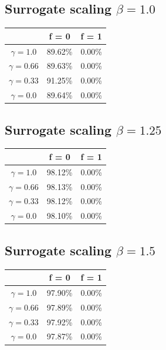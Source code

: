 \documentclass{article}
\begin{document}
\subsection{Surrogate scaling $\beta = 1.0$}
\begin{table}[htbp]
    \centering
    \begin{tabular}{ccc}
        \toprule
        & \textbf{f = 0} & \textbf{f = 1} \\
        \midrule
        $\gamma = 1.0$ & 89.62\% & 0.00\% \\
        $\gamma = 0.66$ & 89.63\% & 0.00\% \\
        $\gamma = 0.33$ & 91.25\% & 0.00\% \\
        $\gamma = 0.0$ & 89.64\% & 0.00\% \\
        \bottomrule
    \end{tabular}
\end{table}
\subsection{Surrogate scaling $\beta = 1.25$}
\begin{table}[htbp]
    \centering
    \begin{tabular}{ccc}
        \toprule
        & \textbf{f = 0} & \textbf{f = 1} \\
        \midrule
        $\gamma = 1.0$ & 98.12\% & 0.00\% \\
        $\gamma = 0.66$ & 98.13\% & 0.00\% \\
        $\gamma = 0.33$ & 98.12\% & 0.00\% \\
        $\gamma = 0.0$ & 98.10\% & 0.00\% \\
        \bottomrule
    \end{tabular}
\end{table}
\subsection{Surrogate scaling $\beta = 1.5$}
\begin{table}[htbp]
    \centering
    \begin{tabular}{ccc}
        \toprule
        & \textbf{f = 0} & \textbf{f = 1} \\
        \midrule
        $\gamma = 1.0$ & 97.90\% & 0.00\% \\
        $\gamma = 0.66$ & 97.89\% & 0.00\% \\
        $\gamma = 0.33$ & 97.92\% & 0.00\% \\
        $\gamma = 0.0$ & 97.87\% & 0.00\% \\
        \bottomrule
    \end{tabular}
\end{table}
\end{document}
